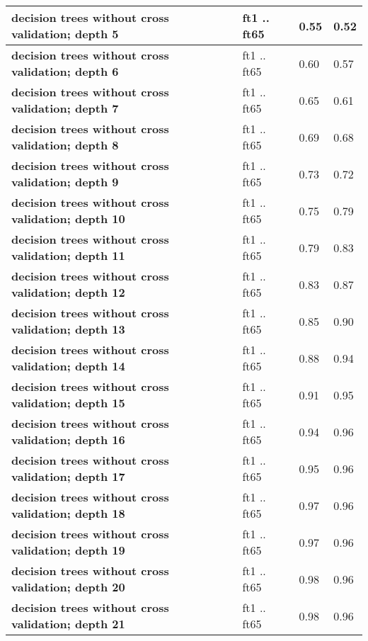 \begin{tabular}{|l|p{1.2in}|p{0.9in}|p{0.9in}|}
      \textbf{ decision trees without cross validation; depth 5 } &  ft1 .. ft65  &  0.55  &  0.52 \\
     \hline
      \textbf{ decision trees without cross validation; depth 6 } &  ft1 .. ft65  &  0.60  &  0.57 \\
     \hline
      \textbf{ decision trees without cross validation; depth 7 } &  ft1 .. ft65  &  0.65  &  0.61 \\
     \hline
      \textbf{ decision trees without cross validation; depth 8 } &  ft1 .. ft65  &  0.69  &  0.68 \\
     \hline
      \textbf{ decision trees without cross validation; depth 9 } &  ft1 .. ft65  &  0.73  &  0.72 \\
     \hline
      \textbf{ decision trees without cross validation; depth 10 } &  ft1 .. ft65  &  0.75  &  0.79 \\
     \hline
      \textbf{ decision trees without cross validation; depth 11 } &  ft1 .. ft65  &  0.79  &  0.83 \\
     \hline
      \textbf{ decision trees without cross validation; depth 12 } &  ft1 .. ft65  &  0.83  &  0.87 \\
     \hline
      \textbf{ decision trees without cross validation; depth 13 } &  ft1 .. ft65  &  0.85  &  0.90 \\
     \hline
      \textbf{ decision trees without cross validation; depth 14 } &  ft1 .. ft65  &  0.88  &  0.94 \\
     \hline
      \textbf{ decision trees without cross validation; depth 15 } &  ft1 .. ft65  &  0.91  &  0.95 \\
     \hline
      \textbf{ decision trees without cross validation; depth 16 } &  ft1 .. ft65  &  0.94  &  0.96 \\
     \hline
      \textbf{ decision trees without cross validation; depth 17 } &  ft1 .. ft65  &  0.95  &  0.96 \\
     \hline
      \textbf{ decision trees without cross validation; depth 18 } &  ft1 .. ft65  &  0.97  &  0.96 \\
     \hline
      \textbf{ decision trees without cross validation; depth 19 } &  ft1 .. ft65  &  0.97  &  0.96 \\
     \hline
      \textbf{ decision trees without cross validation; depth 20 } &  ft1 .. ft65  &  0.98  &  0.96 \\
     \hline
      \textbf{ decision trees without cross validation; depth 21 } &  ft1 .. ft65  &  0.98  &  0.96 \\

\end{tabular}
